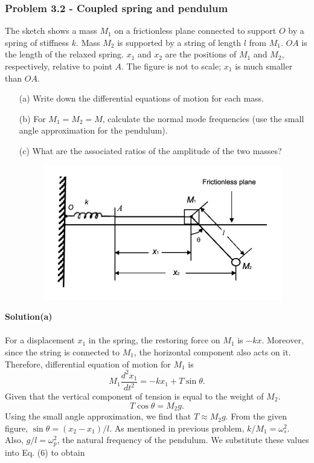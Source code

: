 \documentclass[12pt,a4paper]{article}
\begin{document}
\subsubsection*{Problem 3.2 - Coupled spring and pendulum}
The sketch shows a mass $M_1$ on a frictionless plane connected to support $O$ by a spring of stiffness $k$. Mass $M_2$ is supported by a string of length $l$ from $M_1$. $OA$ is the length of the relaxed spring. $x_1$ and $x_2$ are the positions of $M_1$ and $M_2$, respectively, relative to point $A$. The figure is not to scale; $x_1$ is much smaller than $OA$.
\begin{enumerate}
    \item[(a)]Write down the differential equations of motion for each mass.
    \item[(b)]For $M_1=M_2=M$, calculate the normal mode frequencies (use the small angle approximation for the pendulum).
    \item[(c)]What are the associated ratios of the amplitude of the two masses?
    \begin{figure}[h]
        \centering
        \includegraphics[width=0.6\linewidth]{figs/fig_prob_3.2.png}
    \end{figure}
\end{enumerate}
\textbf{Solution(a)}
\\
\\For a displacement $x_1$ in the spring, the restoring force on $M_1$ is $-kx$. Moreover, since the string is connected to $M_1$, the horizontal component also acts on it. Therefore, differential equation of motion for $M_1$ is
\begin{equation}
    M_1\frac{d^2x_1}{dt^2}=-kx_1+T\sin\theta.
\end{equation}
Given that the vertical component of tension is equal to the weight of $M_2$.
\[T\cos\theta=M_2g.\]
Using the small angle approximation, we find that $T\approx M_2g$. From the given figure, $\sin\theta=(x_2-x_1)/l$. As mentioned in previous problem, $k/M_1=\omega_s^2$. Also, $g/l=\omega_p^2$, the natural frequency of the pendulum. We substitute these values into Eq. (6) to obtain
\end{document}
